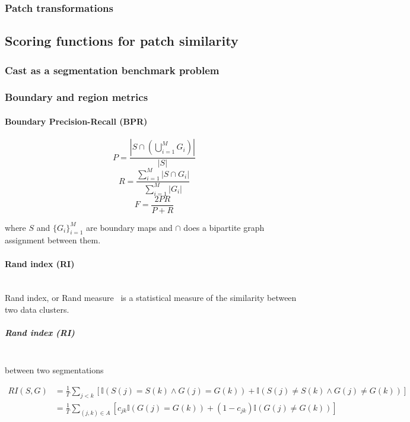 \subsubsection{Patch transformations}
\subsection{Scoring functions for patch similarity}
\subsubsection{Cast as a segmentation benchmark problem}
\subsubsection{Boundary and region metrics}
\label{boundary-and-region-metrics-maths}

\paragraph{Boundary Precision-Recall (BPR)}

\label{BPR-maths}
\[
P=\frac{\left|S\cap\left(\bigcup\limits _{i=1}^{M}G_{i}\right)\right|}{|S|}
\]
\[
R=\frac{{\sum\limits _{i=1}^{M}\left|S\cap G_{i}\right|}}{\sum\limits _{i=1}^{M}\left|G_{i}\right|}
\]
\[
F=\frac{2PR}{P+R}
\]


where $S$ and $\{G_{i}\}_{i=1}^{M}$ are boundary maps and $\cap$
does a bipartite graph assignment between them.

\paragraph{Rand index (RI)}\mbox{}\\
Rand index, or Rand measure~\cite{rand1971objective} is a statistical measure of the similarity between two data clusters.

\subparagraph*{Rand index (RI)}\mbox{}\\
between two segmentations

\begin{align*}
RI(S,G) & =\frac{1}{T}\sum\limits _{j<k}\left[\mathbb{I}\left(S(j)=S(k)\wedge G(j)=G(k)\right)+\mathbb{I}\left(S(j)\neq S(k)\wedge G(j)\neq G(k)\right)\right]\\
 & =\frac{1}{T}\sum\limits _{(j,k)\in A}\left[c_{jk}\mathbb{I}\left(G(j)=G(k)\right)+(1-c_{jk})\mathbb{I}\left(G(j)\neq G(k)\right)\right]
\end{align*}

